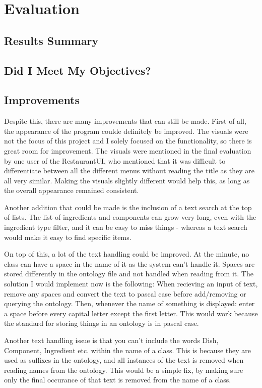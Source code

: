 \chapter{Evaluation}

\section{Results Summary}

\section{Did I Meet My Objectives?}

\section{Improvements}

Despite this, there are many improvements that can still be made. First of all, the appearance of the program coulde definitely be improved. The visuals were not the focus of this project and I solely focused on the functionality, so there is great room for improvement. The visuals were mentioned in the final evaluation by one user of the RestaurantUI, who mentioned that it was difficult to differentiate between all the different menus without reading the title as they are all very similar. Making the visuals slightly different would help this, as long as the overall appearance remained consistent.

Another addition that could be made is the inclusion of a text search at the top of lists. The list of ingredients and components can grow very long, even with the ingredient type filter, and it can be easy to miss things - whereas a text search would make it easy to find specific items.

On top of this, a lot of the text handling could be improved. At the minute, no class can have a space in the name of it as the system can't handle it. Spaces are stored differently in the ontology file and not handled when reading from it. The solution I would implement now is the following: When recieving an input of text, remove any spaces and convert the text to pascal case before add/removing or querying the ontology. Then, whenever the name of something is displayed: enter a space before every capital letter except the first letter. This would work because the standard for storing things in an ontology is in pascal case.

Another text handling issue is that you can't include the words Dish, Component, Ingredient etc. within the name of a class. This is because they are used as suffixes in the ontology, and all instances of the text is removed when reading names from the ontology. This would be a simple fix, by making sure only the final occurance of that text is removed from the name of a class.

